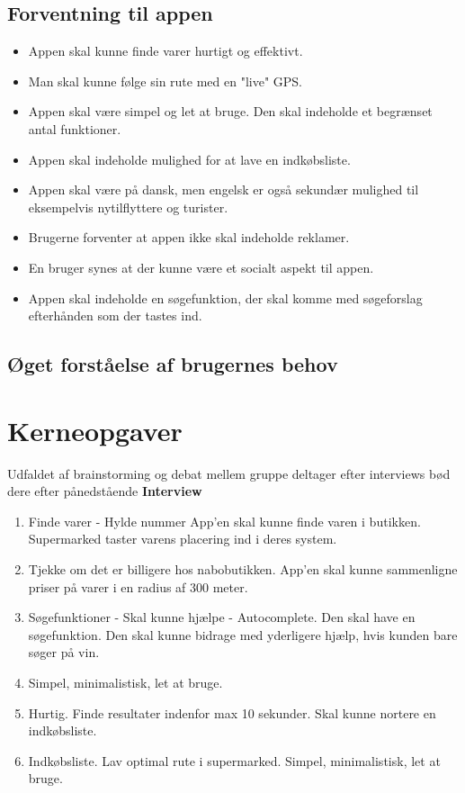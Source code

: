\documentclass[12pt]{article}
\begin{document}
\subsection{Forventning til appen}
\begin{itemize}
\item Appen skal kunne finde varer hurtigt og effektivt.
\item Man skal kunne følge sin rute med en "live" GPS.
\item Appen skal være simpel og let at bruge. Den skal indeholde et begrænset antal funktioner.
\item Appen skal indeholde mulighed for at lave en indkøbsliste.
\item Appen skal være på dansk, men engelsk er også sekundær mulighed til eksempelvis nytilflyttere og turister.
\item Brugerne forventer at appen ikke skal indeholde reklamer.
\item En bruger synes at der kunne være et socialt aspekt til appen.
\item Appen skal indeholde en søgefunktion, der skal komme med søgeforslag efterhånden som der tastes ind.
\end{itemize}
\subsection{Øget forståelse af brugernes behov}

\section{Kerneopgaver}
Udfaldet af brainstorming og debat mellem gruppe deltager efter interviews b\o d dere efter p\aa nedst\aa ende  
\textbf{Interview}\\

\begin{enumerate}
\item Finde varer - Hylde nummer App'en skal kunne finde varen i butikken. Supermarked taster varens placering ind i deres system.
\item Tjekke om det er billigere hos nabobutikken. App'en skal kunne sammenligne priser på varer i en radius af 300 meter.
\item Søgefunktioner - Skal kunne hjælpe - Autocomplete. Den skal have en søgefunktion. Den skal kunne bidrage med yderligere hjælp, 
hvis kunden bare søger på vin. 
\item Simpel, minimalistisk, let at bruge.
\item Hurtig. Finde resultater indenfor max 10 sekunder. Skal kunne nortere en indkøbsliste.
\item Indkøbsliste. Lav optimal rute i supermarked. Simpel, minimalistisk, let at bruge. 
\end{enumerate}
\end{document}
